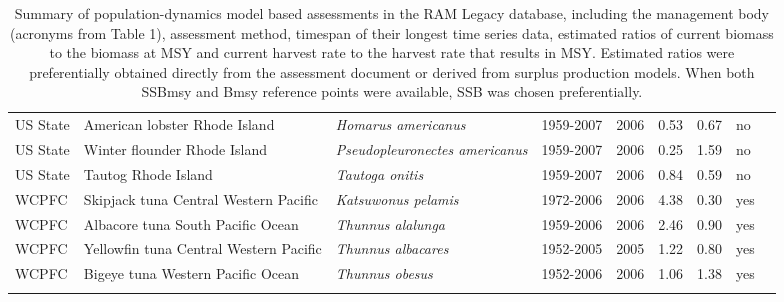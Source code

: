 \begin{longtable}{p{1.8cm}p{4cm}p{4cm}ccccp{1.9cm}c}
  US State & American lobster Rhode Island & \textit{Homarus americanus} & 1959-2007 & 2006 & 0.53 & 0.67 & no & \cite{NA} \\ 
  US State & Winter flounder Rhode Island & \textit{Pseudopleuronectes americanus} & 1959-2007 & 2006 & 0.25 & 1.59 & no & \cite{NA} \\ 
  US State & Tautog Rhode Island & \textit{Tautoga onitis} & 1959-2007 & 2006 & 0.84 & 0.59 & no & \cite{NA} \\ 
  WCPFC & Skipjack tuna Central Western Pacific & \textit{Katsuwonus pelamis} & 1972-2006 & 2006 & 4.38 & 0.30 & yes & \cite{SC4-SA-WP4-SKJ-Assessment-rev1-skipjack.pdf} \\ 
  WCPFC & Albacore tuna South Pacific Ocean & \textit{Thunnus alalunga} & 1959-2006 & 2006 & 2.46 & 0.90 & yes & \cite{JENSEN_ALBWPO_2008.pdf} \\ 
  WCPFC & Yellowfin tuna Central Western Pacific & \textit{Thunnus albacares} & 1952-2005 & 2005 & 1.22 & 0.80 & yes & \cite{WCPFC-SC3-SA-SWG-WP-01.pdf} \\ 
  WCPFC & Bigeye tuna Western Pacific Ocean & \textit{Thunnus obesus} & 1952-2006 & 2006 & 1.06 & 1.38 & yes & \cite{SC4-SA-WP1-rev1-bigeye-tuna.pdf} \\ 
   \hline
\hline
\caption{Summary of population-dynamics model based assessments in the RAM Legacy database, including the management body (acronyms from Table 1), assessment method, timespan of their longest time series data, estimated ratios of current biomass to the biomass at MSY and current harvest rate to the harvest rate that results in MSY. Estimated ratios were preferentially obtained directly from the assessment document or derived from surplus production models. When both SSBmsy and Bmsy reference points were available, SSB was chosen preferentially.}
\label{tab:crosshair}
\end{longtable}
